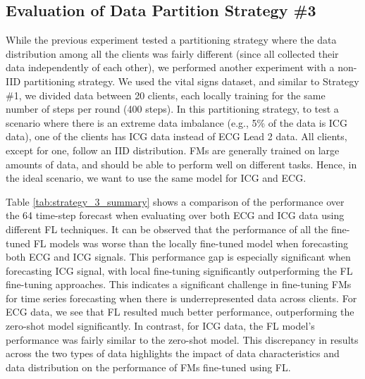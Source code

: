 \subsection{Evaluation of Data Partition Strategy \#3}
While the previous experiment tested a partitioning strategy where the data distribution among all the clients was fairly different (since all collected their data independently of each other), we performed another experiment with a non-IID partitioning strategy.
We used the vital signs dataset, and similar to Strategy \#1, we divided data between 20 clients, each locally training for the same number of steps per round (400 steps).  
In this partitioning strategy, to test a scenario where there is an extreme data imbalance (e.g., 5\% of the data is ICG data), one of the clients has ICG data instead of ECG Lead 2 data. 
All clients, except for one, follow an IID distribution.
FMs are generally trained on large amounts of data, and should be able to perform well on different tasks.
Hence, in the ideal scenario, we want to use the same model for ICG and ECG.

Table \ref{tab:strategy_3_summary} shows a comparison of the performance over the 64 time-step forecast when evaluating over both ECG and ICG data using different FL techniques. It can be observed that the performance of all the fine-tuned FL models was worse than the locally fine-tuned model when forecasting both ECG and ICG signals. 
This performance gap is especially significant when forecasting ICG signal, with local fine-tuning significantly outperforming the FL fine-tuning approaches.
This indicates a significant challenge in fine-tuning FMs for time series forecasting when there is underrepresented data across clients. 
For ECG data, we see that FL resulted much better performance, outperforming the zero-shot model significantly.
In contrast, for ICG data, the FL model's performance was fairly similar to the zero-shot model.
This discrepancy in results across the two types of data highlights the impact of data characteristics and data distribution on the performance of FMs fine-tuned using FL. 



